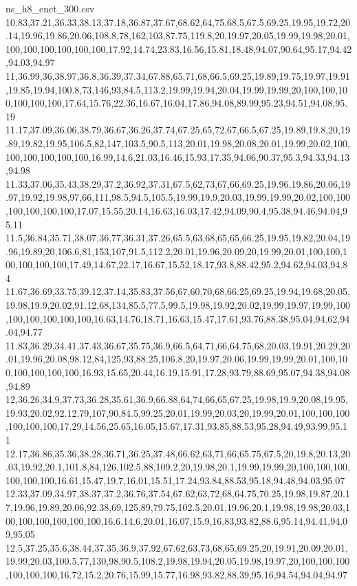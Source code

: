 \begin{filecontents*}[overwrite]{ns_h8_enet_300.csv}
10.83,37.21,36.33,38.13,37.18,36.87,37.67,68.62,64,75,68.5,67.5,69.25,19.95,19.72,20.14,19.96,19.86,20.06,108.8,78,162,103,87.75,119.8,20,19.97,20.05,19.99,19.98,20.01,100,100,100,100,100,100,17.92,14.74,23.83,16.56,15.81,18.48,94.07,90.64,95.17,94.42,94.03,94.97
11,36.99,36,38.97,36.8,36.39,37.34,67.88,65,71,68,66.5,69.25,19.89,19.75,19.97,19.91,19.85,19.94,100.8,73,146,93,84.5,113.2,19.99,19.94,20.04,19.99,19.99,20,100,100,100,100,100,100,17.64,15.76,22.36,16.67,16.04,17.86,94.08,89.99,95.23,94.51,94.08,95.19
11.17,37.09,36.06,38.79,36.67,36.26,37.74,67.25,65,72,67,66.5,67.25,19.89,19.8,20,19.89,19.82,19.95,106.5,82,147,103.5,90.5,113,20.01,19.98,20.08,20.01,19.99,20.02,100,100,100,100,100,100,16.99,14.6,21.03,16.46,15.93,17.35,94.06,90.37,95.3,94.33,94.13,94.98
11.33,37.06,35.43,38.29,37.2,36.92,37.31,67.5,62,73,67,66,69.25,19.96,19.86,20.06,19.97,19.92,19.98,97,66,111,98.5,94.5,105.5,19.99,19.9,20.03,19.99,19.99,20.02,100,100,100,100,100,100,17.07,15.55,20.14,16.63,16.03,17.42,94.09,90.4,95.38,94.46,94.04,95.11
11.5,36.84,35.71,38.07,36.77,36.31,37.26,65.5,63,68,65,65,66.25,19.95,19.82,20.04,19.96,19.89,20,106.6,81,153,107,91.5,112.2,20.01,19.96,20.09,20,19.99,20.01,100,100,100,100,100,100,17.49,14.67,22.17,16.67,15.52,18.17,93.8,88.42,95.2,94.62,94.03,94.84
11.67,36.69,33.75,39.12,37.14,35.83,37.56,67,60,70,68,66.25,69.25,19.94,19.68,20.05,19.98,19.9,20.02,91.12,68,134,85.5,77.5,99.5,19.98,19.92,20.02,19.99,19.97,19.99,100,100,100,100,100,100,16.63,14.76,18.71,16.63,15.47,17.61,93.76,88.38,95.04,94.62,94.04,94.77
11.83,36.29,34.41,37.43,36.67,35.75,36.9,66.5,64,71,66,64.75,68,20.03,19.91,20.29,20.01,19.96,20.08,98.12,84,125,93,88.25,106.8,20,19.97,20.06,19.99,19.99,20.01,100,100,100,100,100,100,16.93,15.65,20.44,16.19,15.91,17.28,93.79,88.69,95.07,94.38,94.08,94.89
12,36.26,34.9,37.73,36.28,35.61,36.9,66.88,64,74,66,65,67.25,19.98,19.9,20.08,19.95,19.93,20.02,92.12,79,107,90,84.5,99.25,20.01,19.99,20.03,20,19.99,20.01,100,100,100,100,100,100,17.29,14.56,25.65,16.05,15.67,17.31,93.85,88.53,95.28,94.49,93.99,95.11
12.17,36.86,35.36,38.28,36.71,36.25,37.48,66.62,63,71,66,65.75,67.5,20,19.8,20.13,20.03,19.92,20.1,101.8,84,126,102.5,88,109.2,20,19.98,20.1,19.99,19.99,20,100,100,100,100,100,100,16.61,15.47,19.7,16.01,15.51,17.24,93.84,88.53,95.18,94.48,94.03,95.07
12.33,37.09,34.97,38.37,37.2,36.76,37.54,67.62,63,72,68,64.75,70.25,19.98,19.87,20.17,19.96,19.89,20.06,92.38,69,125,89,79.75,102.5,20.01,19.96,20.1,19.98,19.98,20.03,100,100,100,100,100,100,16.6,14.6,20.01,16.07,15.9,16.83,93.82,88.6,95.14,94.41,94.09,95.05
12.5,37.25,35.6,38.44,37.35,36.9,37.92,67.62,63,73,68,65,69.25,20,19.91,20.09,20.01,19.99,20.03,100.5,77,130,98,90.5,108.2,19.98,19.94,20.05,19.98,19.97,20,100,100,100,100,100,100,16.72,15.2,20.76,15.99,15.77,16.98,93.82,88.39,95.16,94.54,94.04,94.97

\end{filecontents*}
